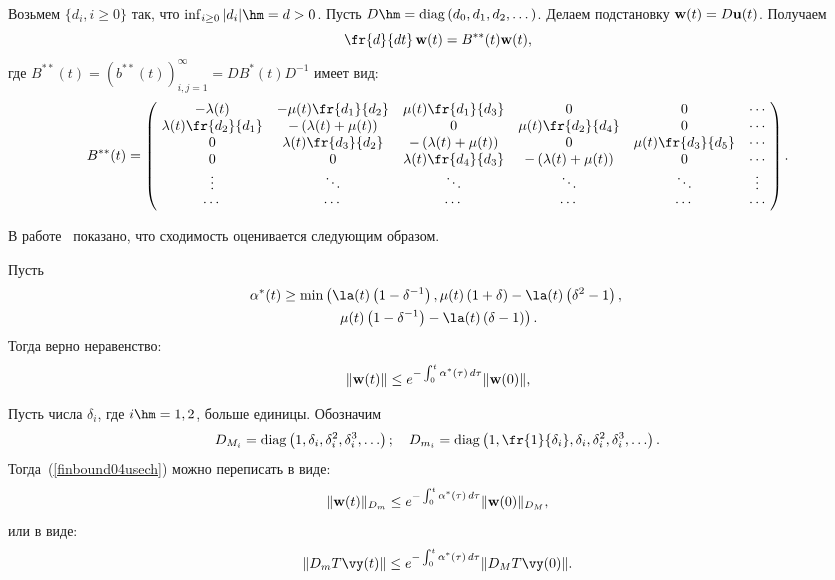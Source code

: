 Возьмем  $\{d_i, i \ge 0 \}$ так, что $\inf\nolimits_{i\ge 0} |d_i| \hm= d>0$.
Пусть  ${D} \hm= \mathrm{diag}\left(d_0, d_1, d_2,\dots \right)$.
Делаем подстановку ${\bf w}(t)= {D}{\bf u}(t)$. Получаем
\begin{equation*}
\fr{d }{dt}\,\mathbf{w}(t)= B^{**}(t)\mathbf{w}(t), %
\end{equation*}
где  $B^{**}(t)=\left(b^{**}(t)\right)_{i,j=1}^{\infty}=
{D}B^{\ast}(t){D}^{-1}$  имеет вид:
\begin{equation*}
B^{**}(t)= \left( \!
\begin{array}{cccccc}
-\lambda(t) & -\mu(t)\fr{d_{1}}{d_{2}} & \mu(t)\fr{d_{1}}{d_{3}} & 0 & 0 &\cdots \\
\lambda(t)\fr{d_{2}}{d_{1}} & -\left(\lambda(t)+\mu(t)\right) & 0 & \mu(t)\fr{d_{2}}{d_{4}}& 0 &\cdots \\
0 & \lambda(t)\fr{d_{3}}{d_{2}} & -\left(\lambda(t)+\mu(t)\right) & 0 & \mu(t)\fr{d_{3}}{d_{5}}& \cdots \\
0 & 0 &\lambda(t)\fr{d_{4}}{d_{3}} & -\left(\lambda(t)+\mu(t)\right) & 0 &  \cdots \\
\vdots & \ddots & \ddots & \ddots & \ddots & \vdots \\
\cdots & \cdots & \cdots & \cdots & \cdots & \cdots
\end{array}
\!\right). %
\end{equation*}

В работе~\cite{articl1} показано, что сходимость оценивается следующим образом.

Пусть
\begin{multline}
\alpha^*(t) \ge \min \left(\la(t)\left(1-\delta^{-1}\right), \mu(t)
\left(1+\delta\right)- \la(t)\left(\delta^{2}-1\right),\right.\\
 \left.\mu(t)
\left(1-\delta^{-1}\right)- \la(t)\left(\delta-1\right) \right).
\label{finbound01}
\end{multline}
Тогда верно неравенство:
\begin{equation}
\|{\mathbf w}(t)\| \le  e^{-\int\nolimits_0^t\alpha^*(\tau)\, d\tau}\|{\mathbf w}(0)\|,
\label{finbound04usech}
\end{equation}

Пусть числа $\delta_i$, где $i\hm=1, 2$, больше единицы. Обозначим
$$
D_{M_i}=\mathrm{diag}\left(1,\delta_i,\delta_i^2,\delta_i^3,\ldots\right); \quad 
D_{m_i}=\mathrm{diag}\left(1,\fr{1}{\delta_i},\delta_i,\delta_i^2,\delta_i^3,\ldots\right).
$$
Тогда~(\ref{finbound04usech}) можно переписать в виде:
\begin{equation}
\|{\mathbf w}(t)\|_{D_m} \le  e^{-\int_0^t\alpha^*(\tau)\, d\tau}\|{\mathbf w}(0)\|_{D_M},
\label{finbound04usech1}
\end{equation}
или в виде:
\begin{equation*}
\|D_m T \vy(t) \| \le  e^{-\int_0^t\alpha^*(\tau)\, d\tau}\|D_M T \vy(0)\|.
\end{equation*}

